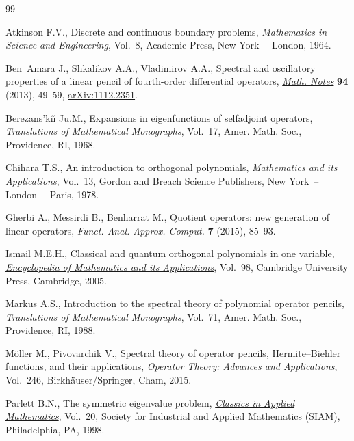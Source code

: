 \documentclass[pdftex]{sigma}
\numberwithin{equation}{section}
\begin{document}
\begin{thebibliography}{99}
\footnotesize\itemsep=0pt

Atkinson F.V., Discrete and continuous boundary problems, \textit{Mathematics
 in Science and Engineering}, Vol.~8, Academic Press, New York~-- London,
 1964.

Ben~Amara J., Shkalikov A.A., Vladimirov A.A., Spectral and oscillatory
 properties of a linear pencil of fourth-order dif\/ferential operators,
 \href{https://doi.org/10.1134/S0001434613070055}{\textit{Math. Notes}} \textbf{94} (2013), 49--59, \href{https://arxiv.org/abs/1112.2351}{arXiv:1112.2351}.

Berezans'ki{\u\i} Ju.M., Expansions in eigenfunctions of selfadjoint operators,
 \textit{Translations of Mathematical Monographs}, Vol.~17, Amer. Math. Soc.,
 Providence, RI, 1968.

Chihara T.S., An introduction to orthogonal polynomials, \textit{Mathematics
 and its Applications}, Vol.~13, Gordon and Breach Science Publishers, New
 York~-- London~-- Paris, 1978.

Gherbi A., Messirdi B., Benharrat M., Quotient operators: new generation of
 linear operators, \textit{Funct. Anal. Approx. Comput.} \textbf{7} (2015),
 85--93.

Ismail M.E.H., Classical and quantum orthogonal polynomials in one variable,
 \href{https://doi.org/10.1017/CBO9781107325982}{\textit{Encyclopedia of Mathematics and its Applications}}, Vol.~98, Cambridge
 University Press, Cambridge, 2005.

Markus A.S., Introduction to the spectral theory of polynomial operator
 pencils, \textit{Translations of Mathe\-ma\-tical Monographs}, Vol.~71, Amer.
 Math. Soc., Providence, RI, 1988.

M\"oller M., Pivovarchik V., Spectral theory of operator pencils,
 {H}ermite--{B}iehler functions, and their applications, \href{https://doi.org/10.1007/978-3-319-17070-1}{\textit{Operator
 Theory: Advances and Applications}}, Vol.~246, Birkh\"auser/Springer, Cham, 2015.

Parlett B.N., The symmetric eigenvalue problem, \href{https://doi.org/10.1137/1.9781611971163}{\textit{Classics in Applied
 Mathematics}}, Vol.~20, Society for Industrial and Applied Mathematics (SIAM),
 Philadelphia, PA, 1998.


\end{thebibliography}
\end{document}
